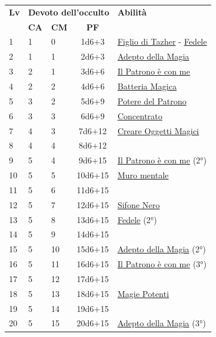 {\begin{multicols}{2}


\noindent\begin{tabularx}{\linewidth}{p{0.3cm}|p{0.3cm}p{0.3cm}c|X|}
	\toprule
 \rowcolor{gray!20}	\textbf{Lv} & \multicolumn{3}{c|}{\textbf{Devoto dell'occulto}} & \textbf{Abilità} \\
& \centering\arraybackslash \textbf{CA} & \centering\arraybackslash \textbf{CM} & \centering\arraybackslash \textbf{PF} & \\
	\toprule
			1 &1	& 0	&	1d6+3	&\hyperlink{Figlio di Tazher}{Figlio di Tazher} - \hyperlink{Fedele}{Fedele}\\
 \rowcolor{gray!20}2	&	1	& 1	&	2d6+3	&\hyperlink{Adepto della Magia}{Adepto della Magia}\\
	3	&	2	& 1	&	3d6+6	&\hyperlink{Il Patrono è con me}{Il Patrono è con me}\\
 \rowcolor{gray!20}4	&	2	& 2	&	4d6+6	& \hyperlink{Batteria Magica}{Batteria Magica}\\
	5	&	3	& 2	&	5d6+9	&\hyperlink{Potere del Patrono}{Potere del Patrono}\\
 \rowcolor{gray!20}6	&	3	& 3	&	6d6+9	&\hyperlink{Concentrato}{Concentrato}\\
	7	&	4	& 3	&	7d6+12	&\hyperlink{Creare Oggetti Magici}{Creare Oggetti Magici}\\
 \rowcolor{gray!20}8	&	4	& 4	&	8d6+12&\\
	9	&	5	& 4	&	9d6+15	&\hyperlink{Il Patrono è con me}{Il Patrono è con me} (2°)\\
 \rowcolor{gray!20}10	&	5	& 5	&	10d6+15	&\hyperlink{Muro mentale}{Muro mentale}\\
	11	&	5	& 6	&	11d6+15	&\\
 \rowcolor{gray!20}12	&	5	& 7	&	12d6+15	&\hyperlink{Sifone Nero}{Sifone Nero}\\
	13	&	5	& 8	&	13d6+15	&\hyperlink{Fedele}{Fedele} (2°)\\
 \rowcolor{gray!20}14	&	5	& 9	&	14d6+15	&\\
	15	&	5	& 10	&	15d6+15	&\hyperlink{Adepto della Magia}{Adepto della Magia} (2°)\\
 \rowcolor{gray!20}16	&	5	& 11	&	16d6+15	&\hyperlink{Il Patrono è con me}{Il Patrono è con me} (3°)\\
	17	&	5	& 12	&	17d6+15	&\\
 \rowcolor{gray!20}18	&	5	& 13	&	18d6+15	&\hyperlink{Magie Potenti}{Magie Potenti}\\
	19	&	5	& 14	&	19d6+15	&\\
 \rowcolor{gray!20}20	&	5	& 15	&	20d6+15	&\hyperlink{Adepto della Magia}{Adepto della Magia} (3°)\\
\end{tabularx}



\end{multicols}}
